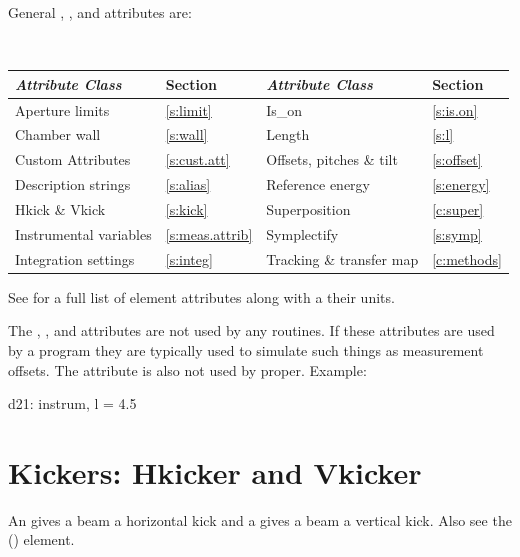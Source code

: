 General , , and  attributes are:
\begin{center}
\tt
\begin{tabular}{llll} \toprule
  {\sl Attribute Class}      & Section             & {\sl Attribute Class}      & Section         \\ \midrule
  Aperture limits            & \ref{s:limit}       & Is_on                      & \ref{s:is.on}   \\
  Chamber wall               & \ref{s:wall}        & Length                     & \ref{s:l}       \\
  Custom Attributes          & \ref{s:cust.att}    & Offsets, pitches \& tilt   & \ref{s:offset}  \\ 
  Description strings        & \ref{s:alias}       & Reference energy           & \ref{s:energy}  \\
  Hkick \& Vkick             & \ref{s:kick}        & Superposition              & \ref{c:super}   \\
  Instrumental variables     & \ref{s:meas.attrib} & Symplectify                & \ref{s:symp}    \\
  Integration settings       & \ref{s:integ}       & Tracking \& transfer map   & \ref{c:methods} \\
  \bottomrule
\end{tabular}
\end{center}
\toffset
See  for a full list of element attributes along with a their units.

The , , and  attributes are not
used by any \bmad routines. If these attributes are used by a program
they are typically used to simulate such things as measurement
offsets. The  attribute is also not used by \bmad
proper. Example:
\begin{example}
  d21: instrum, l = 4.5
\end{example}

\newpage

\section{Kickers: Hkicker and Vkicker}
\label{s:hvkicker}

An  gives a beam a horizontal kick and a  gives a 
beam a vertical kick. Also see the  () element.

